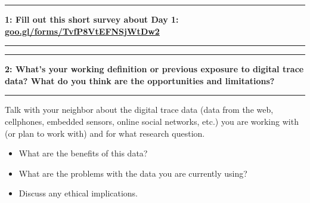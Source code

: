\documentclass[11pt]{article}
\newcommand\question[2]{\vspace{.25in}\hrule\textbf{#1: #2}\vspace{.5em}\hrule\vspace{.10in}}
\begin{document}
\raggedright
\newcommand\NAME{Allie Morgan} 

\vspace{-0.2 in}
\question{1}{Fill out this short survey about Day 1: \href{https://goo.gl/forms/TvfP8VtEFNSjWtDw2}{goo.gl/forms/TvfP8VtEFNSjWtDw2}} 
\vspace{1 in}

\question{2}{What's your working definition or previous exposure to digital trace data? What do you think are the opportunities and limitations?}

Talk with your neighbor about the digital trace data (data from the web, cellphones, embedded sensors, online social networks, etc.) you are working with (or plan to work with) and for what research question. 
\begin{itemize}
\item What are the benefits of this data? 
\item What are the problems with the data you are currently using? 
\item Discuss any ethical implications.
\end{itemize}
\end{document}
